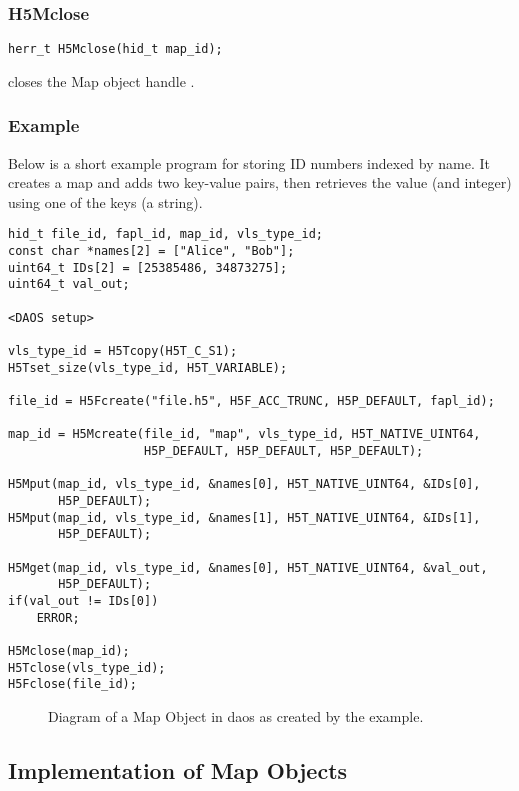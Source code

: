 \documentclass[../design_doc.tex]{subfiles}
\begin{document}
\subsubsection{H5Mclose}

\begin{verbatim}
herr_t H5Mclose(hid_t map_id);
\end{verbatim}

 closes the Map object handle .

\subsubsection{Example}

Below is a short example program for storing ID numbers indexed by name. It creates a map and adds two key-value pairs, then retrieves the value (and integer) using one of the keys (a string).
\begin{verbatim}
hid_t file_id, fapl_id, map_id, vls_type_id;
const char *names[2] = ["Alice", "Bob"];
uint64_t IDs[2] = [25385486, 34873275];
uint64_t val_out;

<DAOS setup>

vls_type_id = H5Tcopy(H5T_C_S1);
H5Tset_size(vls_type_id, H5T_VARIABLE);

file_id = H5Fcreate("file.h5", H5F_ACC_TRUNC, H5P_DEFAULT, fapl_id);

map_id = H5Mcreate(file_id, "map", vls_type_id, H5T_NATIVE_UINT64, 
                   H5P_DEFAULT, H5P_DEFAULT, H5P_DEFAULT);

H5Mput(map_id, vls_type_id, &names[0], H5T_NATIVE_UINT64, &IDs[0],
       H5P_DEFAULT);
H5Mput(map_id, vls_type_id, &names[1], H5T_NATIVE_UINT64, &IDs[1],
       H5P_DEFAULT);

H5Mget(map_id, vls_type_id, &names[0], H5T_NATIVE_UINT64, &val_out,
       H5P_DEFAULT);
if(val_out != IDs[0])
	ERROR;

H5Mclose(map_id);
H5Tclose(vls_type_id);
H5Fclose(file_id);
\end{verbatim}

\begin{figure}
\caption{Diagram of a Map Object in \acrshort{daos} as created by the example.}
\label{fig:map}
\end{figure}

\subsection{Implementation of Map Objects}
\end{document}
